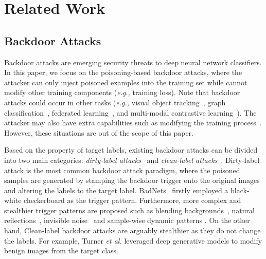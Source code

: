\section{Related Work}
\subsection{Backdoor Attacks}
Backdoor attacks are emerging security threats to deep neural network classifiers. In this paper, we focus on the poisoning-based backdoor attacks, where the attacker can only inject poisoned examples into the training set while cannot modify other training components (\emph{e.g.,} training loss). Note that backdoor attacks could occur in other tasks (\emph{e.g.,} visual object tracking~\cite{li2022few}, graph classification~\cite{zhang2021backdoor}, federated learning~\cite{zhang2022fldetector}, and multi-modal contrastive learning~\cite{backdoorcontrast}). The attacker may also have extra capabilities such as modifying the training process~\cite{latentbackdoor}. However, these situations are out of the scope of this paper.

Based on the property of target labels, existing backdoor attacks can be divided into two main categories: \emph{dirty-label attacks}~ \cite{gu2017badnets,chen2017targeted,liu2020reflection, zhang2021backdoor} and \emph{clean-label attacks}~\cite{shafahi2018poison,turner2019clean,zhu2019transferable,zhao2020clean,saha2020hidden}. Dirty-label attack is the most common backdoor attack paradigm, where the poisoned samples are generated by stamping the backdoor trigger onto the original images and altering the labels to the target label. BadNets~\cite{gu2017badnets} firstly employed a black-white checkerboard as the trigger pattern. Furthermore, more complex and stealthier trigger patterns are proposed such as blending backgrounds~\cite{chen2017targeted}, natural reflections~\cite{liu2020reflection}, invisible noise~\cite{liao2018backdoor,li2019invisible,chen2019invisible}  and sample-wise dynamic patterns \cite{nguyen2020input,li2021invisible, nguyen2021wanet}.
On the other hand, Clean-label backdoor attacks are arguably stealthier as they do not change the labels. For example, Turner \emph{et al.} \cite{turner2019clean} leveraged deep generative models to modify benign images from the target class.

